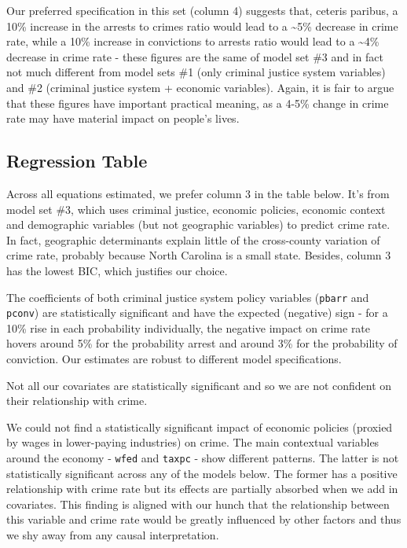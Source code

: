 \documentclass[]{article}
\begin{document}
Our preferred specification in this set (column 4) suggests that,
ceteris paribus, a 10\% increase in the arrests to crimes ratio would
lead to a \textasciitilde{}5\% decrease in crime rate, while a 10\%
increase in convictions to arrests ratio would lead to a
\textasciitilde{}4\% decrease in crime rate - these figures are the same
of model set \#3 and in fact not much different from model sets \#1
(only criminal justice system variables) and \#2 (criminal justice
system + economic variables). Again, it is fair to argue that these
figures have important practical meaning, as a 4-5\% change in crime
rate may have material impact on people's lives.

\hypertarget{regression-table}{%
\subsection{Regression Table}\label{regression-table}}

Across all equations estimated, we prefer column 3 in the table below.
It's from model set \#3, which uses criminal justice, economic policies,
economic context and demographic variables (but not geographic
variables) to predict crime rate. In fact, geographic determinants
explain little of the cross-county variation of crime rate, probably
because North Carolina is a small state. Besides, column 3 has the
lowest BIC, which justifies our choice.

The coefficients of both criminal justice system policy variables
(\texttt{pbarr} and \texttt{pconv}) are statistically significant and
have the expected (negative) sign - for a 10\% rise in each probability
individually, the negative impact on crime rate hovers around 5\% for
the probability arrest and around 3\% for the probability of conviction.
Our estimates are robust to different model specifications.

Not all our covariates are statistically significant and so we are not
confident on their relationship with crime.

We could not find a statistically significant impact of economic
policies (proxied by wages in lower-paying industries) on crime. The
main contextual variables around the economy - \texttt{wfed} and
\texttt{taxpc} - show different patterns. The latter is not
statistically significant across any of the models below. The former has
a positive relationship with crime rate but its effects are partially
absorbed when we add in covariates. This finding is aligned with our
hunch that the relationship between this variable and crime rate would
be greatly influenced by other factors and thus we shy away from any
causal interpretation.
\end{document}
